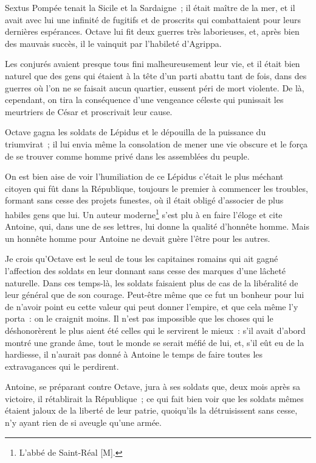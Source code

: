 \documentclass[french,twoside]{book} %
\newcommand\chaptercont{} %
\begin{document}
\chaptercont
\noindent Sextus Pompée tenait la Sicile et la Sardaigne ; il était maître de la mer, et il avait avec lui une infinité de fugitifs et de proscrits qui combattaient pour leurs dernières espérances. Octave lui fit deux guerres très laborieuses, et, après bien des mauvais succès, il le vainquit par l’habileté d’Agrippa.\par
Les conjurés avaient presque tous fini malheureusement leur vie, et il était bien naturel que des gens qui étaient à la tête d’un parti abattu tant de fois, dans des guerres où l’on ne se faisait aucun quartier, eussent péri de mort violente. De là, cependant, on tira la conséquence d’une vengeance céleste qui punissait les meurtriers de César et proscrivait leur cause.\par
Octave gagna les soldats de Lépidus et le dépouilla de la puissance du triumvirat ; il lui envia même la consolation de mener une vie obscure et le força de se trouver comme homme privé dans les assemblées du peuple.\par
On est bien aise de voir l’humiliation de ce Lépidus c’était le plus méchant citoyen qui fût dans la République, toujours le premier à commencer les troubles, formant sans cesse des projets funestes, où il était obligé d’associer de plus habiles gens que lui. Un auteur moderne\footnote{L’abbé de Saint-Réal [M].} s’est plu à en faire l’éloge et cite Antoine, qui, dans une de ses lettres, lui donne la qualité d’honnête homme. Mais un honnête homme pour Antoine ne devait guère l’être pour les autres.\par
Je crois qu’Octave est le seul de tous les capitaines romains qui ait gagné l’affection des soldats en leur donnant sans cesse des marques d’une lâcheté naturelle. Dans ces temps-là, les soldats faisaient plus de cas de la libéralité de leur général que de son courage. Peut-être même que ce fut un bonheur pour lui de n’avoir point eu cette valeur qui peut donner l’empire, et que cela même l’y porta : on le craignit moins. Il n’est pas impossible que les choses qui le déshonorèrent le plus aient été celles qui le servirent le mieux : s’il avait d’abord montré une grande âme, tout le monde se serait méfié de lui, et, s’il eût eu de la hardiesse, il n’aurait pas donné à Antoine le temps de faire toutes les extravagances qui le perdirent.\par
Antoine, se préparant contre Octave, jura à ses soldats que, deux mois après sa victoire, il rétablirait la République ; ce qui fait bien voir que les soldats mêmes étaient jaloux de la liberté de leur patrie, quoiqu’ils la détruisissent sans cesse, n’y ayant rien de si aveugle qu’une armée.\par
\end{document}
